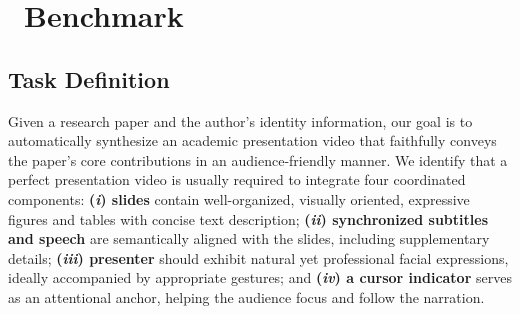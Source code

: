 



\vspace{-0.2\baselineskip} 
\section{\bench~Benchmark}
\vspace{-0.4\baselineskip} 
\subsection{Task Definition}
\vspace{-0.4\baselineskip} 
Given a research paper and the author’s identity information, our goal is to automatically synthesize an academic presentation video that faithfully conveys the paper’s core contributions in an audience-friendly manner. 
We identify that a perfect presentation video is usually required to integrate four coordinated components: 
\textbf{(\textit{i}) slides} contain well-organized, visually oriented, expressive figures and tables with concise text description;
\textbf{(\textit{ii}) synchronized subtitles and speech} are semantically aligned with the slides, including supplementary details;
\textbf{(\textit{iii}) presenter} should exhibit natural yet professional facial expressions, ideally accompanied by appropriate gestures;
and \textbf{(\textit{iv}) a cursor indicator} serves as an attentional anchor, helping the audience focus and follow the narration.

